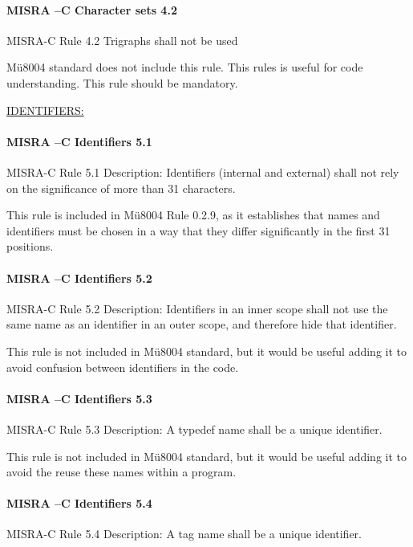 \paragraph{MISRA –C Character sets 4.2}
MISRA-C Rule 4.2 Trigraphs shall not be used


Mü8004 standard does not include this rule. This rules is useful for code understanding. This rule should be mandatory.


\begin{center}
\textsc{\underline{IDENTIFIERS:}}
\end{center}

\paragraph{MISRA –C Identifiers 5.1}
MISRA-C Rule 5.1 Description: Identifiers (internal and external) shall not rely on the significance of more than 31 characters.

This rule is included in Mü8004 Rule 0.2.9, as it establishes that names and identifiers must be chosen in a way that they differ significantly in the first 31 positions.

\paragraph{MISRA –C Identifiers 5.2}
MISRA-C Rule 5.2 Description: Identifiers in an inner scope shall not use the same name as an identifier in an outer scope, and therefore hide that identifier.

This rule is not included in Mü8004 standard, but it would be useful adding it to avoid confusion between identifiers in the code.


\paragraph{MISRA –C Identifiers 5.3}
MISRA-C Rule 5.3 Description: A typedef name shall be a unique identifier.

This rule is not included in Mü8004 standard, but it would be useful adding it to avoid the reuse these names within a program.


\paragraph{MISRA –C Identifiers 5.4}
MISRA-C Rule 5.4 Description: A tag name shall be a unique identifier.

